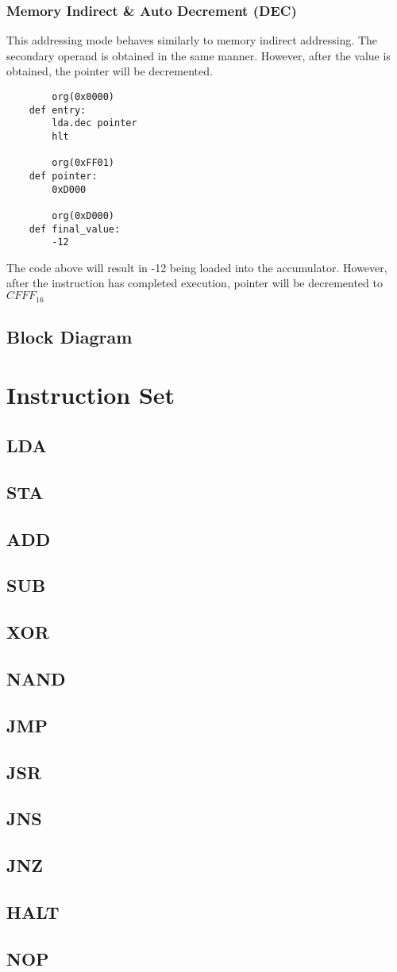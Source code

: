 \documentclass[11pt]{article}
\begin{document}
    \subsubsection{Memory Indirect \& Auto Decrement (DEC)}
    This addressing mode behaves similarly to memory indirect addressing.
    The secondary operand is obtained in the same manner.
    However, after the value is obtained, the pointer will be decremented.
    \begin{verbatim}
        org(0x0000)
    def entry:
        lda.dec pointer
        hlt

        org(0xFF01)
    def pointer:
        0xD000

        org(0xD000)
    def final_value:
        -12
    \end{verbatim}
    The code above will result in -12 being loaded into the accumulator.
    However, after the instruction has completed execution, pointer will be decremented to $CFFF_{16}$

    \subsection{Block Diagram}\label{subsec:block-diagram}
    \pagebreak

    \section{Instruction Set}
    \subsection{LDA}
    \subsection{STA}
    \subsection{ADD}
    \subsection{SUB}
    \subsection{XOR}
    \subsection{NAND}
    \subsection{JMP}
    \subsection{JSR}
    \subsection{JNS}
    \subsection{JNZ}
    \subsection{HALT}
    \subsection{NOP}
\end{document}
